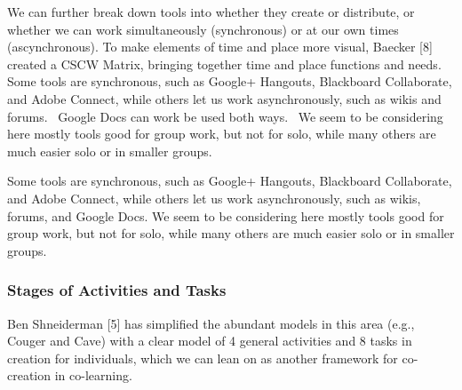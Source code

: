 We can further break down tools into whether they create or distribute,
or whether we can work simultaneously (synchronous) or at our own times
(ascynchronous). To make elements of time and place more visual, Baecker
{[}8{]} created a CSCW Matrix, bringing together time and place
functions and needs. Some tools are synchronous, such as Google+
Hangouts, Blackboard Collaborate, and Adobe Connect, while others let us
work asynchronously, such as wikis and forums.~ Google Docs can work be
used both ways.~ We seem to be considering here mostly tools good for
group work, but not for solo, while many others are much easier solo or
in smaller groups.


Some tools are synchronous, such as Google+ Hangouts, Blackboard
Collaborate, and Adobe Connect, while others let us work asynchronously,
such as wikis, forums, and Google Docs. We seem to be considering here
mostly tools good for group work, but not for solo, while many others
are much easier solo or in smaller groups.

\subsubsection{Stages of Activities and Tasks}

Ben Shneiderman {[}5{]} has simplified the abundant models in this area
(e.g., Couger and Cave) with a clear model of 4 general activities and 8
tasks in creation for individuals, which we can lean on as another
framework for co-creation in co-learning.

